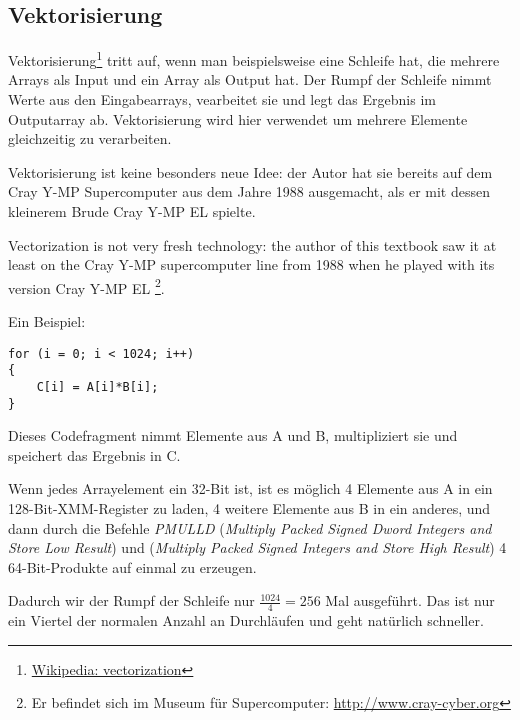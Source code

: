 \subsection{Vektorisierung}

\newcommand{\URLVEC}{\href{http://en.wikipedia.org/wiki/Vectorization_(computer_science)}{Wikipedia: vectorization}}
Vektorisierung\footnote{\URLVEC} tritt auf, wenn man beispielsweise eine Schleife hat, die mehrere Arrays als Input und
ein Array als Output hat. Der Rumpf der Schleife nimmt Werte aus den Eingabearrays, vearbeitet sie und legt das Ergebnis
im Outputarray ab.
Vektorisierung wird hier verwendet um mehrere Elemente gleichzeitig zu verarbeiten.

Vektorisierung ist keine besonders neue Idee: der Autor hat sie bereits auf dem Cray Y-MP Supercomputer aus dem Jahre
1988 ausgemacht, als er mit dessen kleinerem Brude Cray Y-MP EL spielte.

Vectorization is not very fresh technology: the author of this textbook saw it at least on the Cray Y-MP 
supercomputer line from 1988 when he played with its  version Cray Y-MP EL
\footnote{Er befindet sich im Museum für Supercomputer: \url{http://www.cray-cyber.org}}.

Ein Beispiel:

\begin{lstlisting}[style=customc]
for (i = 0; i < 1024; i++)
{
    C[i] = A[i]*B[i];
}
\end{lstlisting}

Dieses Codefragment nimmt Elemente aus A und B, multipliziert sie und speichert das Ergebnis in C.

\newcommand{\PMULLD}{\emph{PMULLD} (\emph{Multiply Packed Signed Dword Integers and Store Low Result})}
\newcommand{\PMULHW}{\TT{PMULHW} (\emph{Multiply Packed Signed Integers and Store High Result})}
Wenn jedes Arrayelement ein 32-Bit \Tint ist, ist es möglich 4 Elemente aus A in ein 128-Bit-XMM-Register zu laden, 4
weitere Elemente aus B in ein anderes, und dann durch die Befehle \PMULLD{} und \PMULHW{} 4 64-Bit-Produkte auf einmal
zu erzeugen.

Dadurch wir der Rumpf der Schleife nur $\frac{1024}{4}=256$ Mal ausgeführt. Das ist nur ein Viertel der normalen Anzahl
an Durchläufen und geht natürlich schneller.

\newcommand{\URLINTELVEC}{\href{http://www.intel.com/intelpress/sum_vmmx.htm}{Auszug: Effektive automatische Vektorisierung}}

